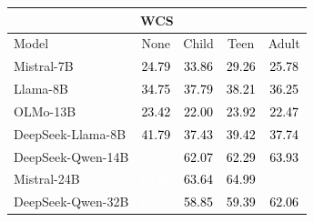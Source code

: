 \begin{figure}[H]
\begin{tabular}{lcccc}
\end{tabular}
\vspace{1.0em}
\begin{tabular}{lcccc}
\multicolumn{5}{c}{\textbf{WCS}} \\
\toprule
Model & None & Child & Teen & Adult \\
\midrule
Mistral-7B & \cellcolor[HTML]{CED5E5}\textcolor{black}{24.79} & \cellcolor[HTML]{BDC6DB}\textcolor{black}{33.86} & \cellcolor[HTML]{C6CFE1}\textcolor{black}{29.26} & \cellcolor[HTML]{CCD4E4}\textcolor{black}{25.78} \\
Llama-8B & \cellcolor[HTML]{BBC5DA}\textcolor{black}{34.75} & \cellcolor[HTML]{B5C0D7}\textcolor{black}{37.79} & \cellcolor[HTML]{B5C0D7}\textcolor{black}{38.21} & \cellcolor[HTML]{B9C3D9}\textcolor{black}{36.25} \\
OLMo-13B & \cellcolor[HTML]{D2D9E7}\textcolor{black}{23.42} & \cellcolor[HTML]{D4DAE8}\textcolor{black}{22.00} & \cellcolor[HTML]{D0D7E6}\textcolor{black}{23.92} & \cellcolor[HTML]{D4DAE8}\textcolor{black}{22.47} \\
DeepSeek-Llama-8B & \cellcolor[HTML]{ADB9D3}\textcolor{black}{41.79} & \cellcolor[HTML]{B7C1D8}\textcolor{black}{37.43} & \cellcolor[HTML]{B3BED6}\textcolor{black}{39.42} & \cellcolor[HTML]{B5C0D7}\textcolor{black}{37.74} \\
DeepSeek-Qwen-14B & \cellcolor[HTML]{7E91BA}\textcolor{white}{66.20} & \cellcolor[HTML]{8697BE}\textcolor{black}{62.07} & \cellcolor[HTML]{8697BE}\textcolor{black}{62.29} & \cellcolor[HTML]{8294BC}\textcolor{black}{63.93} \\
Mistral-24B & \cellcolor[HTML]{788CB7}\textcolor{white}{69.38} & \cellcolor[HTML]{8294BC}\textcolor{black}{63.64} & \cellcolor[HTML]{8092BB}\textcolor{black}{64.99} & \cellcolor[HTML]{7E91BA}\textcolor{white}{65.85} \\
DeepSeek-Qwen-32B & \cellcolor[HTML]{7E91BA}\textcolor{white}{65.53} & \cellcolor[HTML]{8C9CC1}\textcolor{black}{58.85} & \cellcolor[HTML]{8C9CC1}\textcolor{black}{59.39} & \cellcolor[HTML]{8697BE}\textcolor{black}{62.06} \\
\bottomrule
\end{tabular}
\end{figure}
